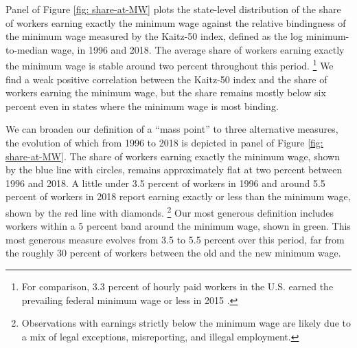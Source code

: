 Panel  of Figure \ref{fig: share-at-MW}
plots the state-level distribution of the share of workers
earning exactly the minimum wage against the relative
bindingness of the minimum wage measured by the Kaitz-50 index, defined
as the log minimum-to-median wage, in 1996 and 2018. The average share of workers earning exactly the minimum wage is stable around two percent throughout this period.%
%
\footnote{For comparison, 3.3 percent of hourly paid workers in the U.S. earned the prevailing federal minimum wage or less in 2015 .} %
%
We find a weak positive correlation between the Kaitz-50 index and the
share of workers earning the minimum wage, but the share remains
mostly below six percent even in states where the minimum wage is
most binding.

We can broaden our definition of a ``mass point'' to three alternative measures, the evolution of which from 1996 to 2018 is depicted in panel 
of Figure \ref{fig: share-at-MW}. The share of workers earning exactly
the minimum wage, shown by the blue line with circles, remains approximately flat at two percent between 1996 and 2018.
A little under 3.5 percent of workers in 1996 and around 5.5 percent of workers in 2018 report earning exactly or less than the minimum wage,
shown by the red line with diamonds.%
%
\footnote{Observations with earnings strictly below the minimum wage are likely due to a mix
of legal exceptions, misreporting, and illegal employment.} %
%
Our most generous definition includes workers within a 5 percent band around
the minimum wage, shown in green. This most generous measure evolves
from 3.5 to 5.5 percent over this period, far from the roughly 30 percent
of workers between the old and the new minimum wage.



